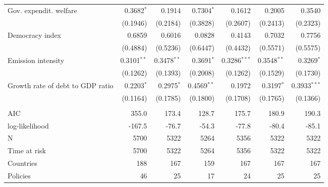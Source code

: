 \begin{tabular}{lrrrrrr}
Gov. expendit. welfare           &      0.3682$^{*}$ &            0.1914 &      0.7304$^{*}$ &            0.1612 &            0.2005 &            0.3540 \\
                                 &          (0.1946) &          (0.2184) &          (0.3828) &          (0.2607) &          (0.2413) &          (0.2323) \\
Democracy index                  &            0.6859 &            0.6016 &            0.0828 &            0.4143 &            0.7032 &            0.7756 \\
                                 &          (0.4884) &          (0.5236) &          (0.6447) &          (0.4432) &          (0.5571) &          (0.5575) \\
Emission intensity               &    0.3101$^{* *}$ &    0.3478$^{* *}$ &      0.3691$^{*}$ &  0.3286$^{* * *}$ &    0.3548$^{* *}$ &      0.3269$^{*}$ \\
                                 &          (0.1262) &          (0.1393) &          (0.2008) &          (0.1262) &          (0.1529) &          (0.1730) \\
Growth rate of debt to GDP ratio &      0.2203$^{*}$ &      0.2975$^{*}$ &    0.4569$^{* *}$ &            0.1972 &      0.3197$^{*}$ &  0.3933$^{* * *}$ \\
                                 &          (0.1164) &          (0.1785) &          (0.1800) &          (0.1708) &          (0.1765) &          (0.1366) \\
                                 &                   &                   &                   &                   &                   &                   \\
AIC                              &             355.0 &             173.4 &             128.7 &             175.7 &             180.9 &             190.3 \\
log-likelihood                   &            -167.5 &             -76.7 &             -54.3 &             -77.8 &             -80.4 &             -85.1 \\
N                                &              5700 &              5322 &              5264 &              5356 &              5322 &              5322 \\
Time at risk                     &              5700 &              5322 &              5264 &              5356 &              5322 &              5322 \\
Countries                        &               188 &               167 &               159 &               167 &               167 &               167 \\
Policies                         &                46 &                25 &                17 &                24 &                25 &                25 \\
\bottomrule
\end{tabular}
